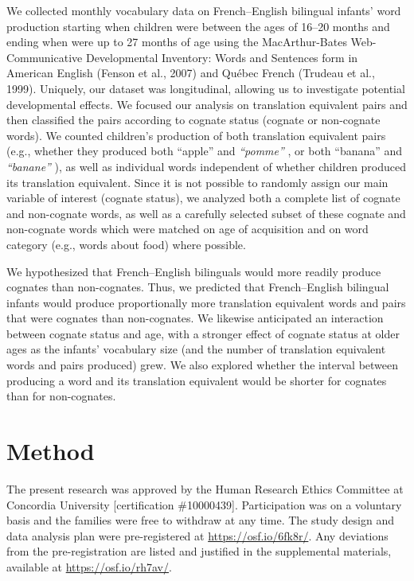 \documentclass[
  ,man,floatsintext]{apa6}
\begin{document}
We collected monthly vocabulary data on French--English bilingual infants' word production starting when children were between the ages of 16--20 months and ending when were up to 27 months of age using the MacArthur-Bates Web-Communicative Developmental Inventory: Words and Sentences form in American English (Fenson et al., 2007) and Québec French (Trudeau et al., 1999). Uniquely, our dataset was longitudinal, allowing us to investigate potential developmental effects. We focused our analysis on translation equivalent pairs and then classified the pairs according to cognate status (cognate or non-cognate words). We counted children's production of both translation equivalent pairs (e.g., whether they produced both ``apple''  and \emph{``pomme''} , or both ``banana''  and \emph{``banane''} ), as well as individual words independent of whether children produced its translation equivalent. Since it is not possible to randomly assign our main variable of interest (cognate status), we analyzed both a complete list of cognate and non-cognate words, as well as a carefully selected subset of these cognate and non-cognate words which were matched on age of acquisition and on word category (e.g., words about food) where possible.

We hypothesized that French--English bilinguals would more readily produce cognates than non-cognates. Thus, we predicted that French--English bilingual infants would produce proportionally more translation equivalent words and pairs that were cognates than non-cognates. We likewise anticipated an interaction between cognate status and age, with a stronger effect of cognate status at older ages as the infants' vocabulary size (and the number of translation equivalent words and pairs produced) grew. We also explored whether the interval between producing a word and its translation equivalent would be shorter for cognates than for non-cognates.

\hypertarget{method}{%
\section{Method}\label{method}}

The present research was approved by the Human Research Ethics Committee at Concordia University {[}certification \#10000439{]}. Participation was on a voluntary basis and the families were free to withdraw at any time. The study design and data analysis plan were pre-registered at \url{https://osf.io/6fk8r/}. Any deviations from the pre-registration are listed and justified in the supplemental materials, available at \url{https://osf.io/rh7av/}.
\end{document}
